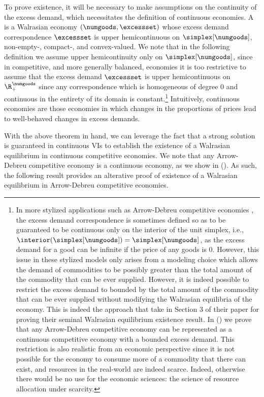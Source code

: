 To prove existence, it will be necessary to make assumptions on the continuity of the excess demand, which necessitates the definition of continuous economies. A  is a Walrasian economy $(\numgoods, \excessset)$ whose excess demand correspondence $\excessset$ is upper hemicontinuous on $\simplex[\numgoods]$, non-empty-, compact-, and convex-valued. We note that in the following definition we assume upper hemicontinuity only on $\simplex[\numgoods]$, since in competitive, and more generally balanced, economies it is too restrictive to assume that the excess demand $\excessset$ is upper hemicontinuous on $\R^\numgoods_+$ since any correspondence which is homogeneous of degree $0$ and continuous in the entirety of its domain is constant.\footnote{In more stylized applications such as Arrow-Debreu competitive economies \cite{arrow-debreu}, the excess demand correspondence is sometimes defined so as to be guaranteed to be continuous only on the interior of the unit simplex, i.e., $\interior(\simplex[\numgoods]) = \simplex[\numgoods]$, as the excess demand for a good can be infinite if the price of any goods is 0. However, this issue in these stylized models only arises from a modeling choice which allows the demand of commodities to be possibly greater than the total amount of the commodity that can be ever supplied. However, it is indeed possible to restrict the excess demand to bounded by the total amount of the commodity that can be ever supplied without modifying the Walrasian equilibria of the economy. This is indeed the approach that \citet{arrow-debreu} take in Section 3 of their paper for proving their seminal Walrasian equilibrium existence result. In  () we prove that any Arrow-Debreu competitive economy can be represented as a continuous competitive economy with a bounded excess demand. This restriction is also realistic from an economic perspective since it is not possible for the economy to consume more of a commodity that there can exist, and resources in the real-world are indeed scarce. Indeed, otherwise there would be no use for the economic sciences: the science of resource allocation under scarcity.} Intuitively, continuous economies are those economies in which changes in the proportions of prices lead to well-behaved changes in excess demands.

With the above theorem in hand, we can leverage the fact that a strong solution is guaranteed in continuous VIs to establish the existence of a Walrasian equilibrium in continuous competitive economies. We note that any Arrow-Debreu competitive economy is a continuous economy, as we show in  (). As such, the following result provides an alterative proof of existence of a Walrasian equilibrium in Arrow-Debreu competitive economies.


